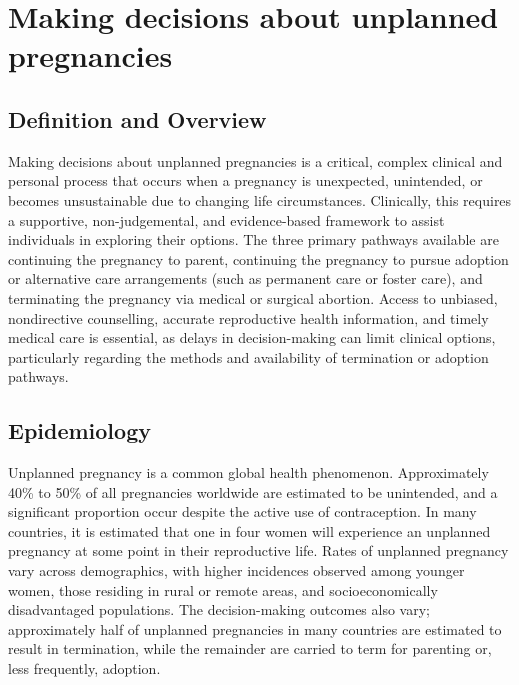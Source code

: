 \chapter{Making decisions about unplanned pregnancies}

\section*{Definition and Overview}
Making decisions about unplanned pregnancies is a critical, complex clinical and personal process that occurs when a pregnancy is unexpected, unintended, or becomes unsustainable due to changing life circumstances. Clinically, this requires a supportive, non-judgemental, and evidence-based framework to assist individuals in exploring their options. The three primary pathways available are continuing the pregnancy to parent, continuing the pregnancy to pursue adoption or alternative care arrangements (such as permanent care or foster care), and terminating the pregnancy via medical or surgical abortion. Access to unbiased, nondirective counselling, accurate reproductive health information, and timely medical care is essential, as delays in decision-making can limit clinical options, particularly regarding the methods and availability of termination or adoption pathways.

\section*{Epidemiology}
Unplanned pregnancy is a common global health phenomenon. Approximately 40\% to 50\% of all pregnancies worldwide are estimated to be unintended, and a significant proportion occur despite the active use of contraception. In many countries, it is estimated that one in four women will experience an unplanned pregnancy at some point in their reproductive life. Rates of unplanned pregnancy vary across demographics, with higher incidences observed among younger women, those residing in rural or remote areas, and socioeconomically disadvantaged populations. The decision-making outcomes also vary; approximately half of unplanned pregnancies in many countries are estimated to result in termination, while the remainder are carried to term for parenting or, less frequently, adoption.

